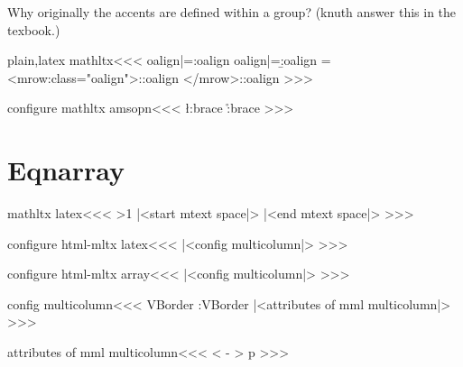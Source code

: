 {{Why originally the accents are defined within a group? (knuth answer
this in the texbook.)

\<plain,latex mathltx\><<<
\let\A:oalign|=\a:oalign
\let\B:oalign|=\b:oalign
   {\ifmmode {}%
             \let\halign|=\TeXhalign
             \Tg<mrow\Hnewline \mml:class="oalign">\else\A:oalign
    \fi}
   {\ifmmode \Tg</mrow>\else\B:oalign\fi}
>>>


\<configure mathltx amsopn\><<<
   {
      {\string\mathop\l:brace}
      {\r:brace}
      {}}
>>>



\section{Eqnarray}

\<mathltx latex\><<<
   {\HCode{\string\begin{eqnarray\ifx 
       \@seqncr\@eqncr\else *\fi}}}
   {\HCode{\string\end{eqnarray\ifx
       \@seqncr\@eqncr\else *\fi}}}
   {}
   {\HCode{\string\\\Hnewline}}
   {\ifnum \HCol>1 
      \ifnum {}       
        \HCode{\%}%
        |<start mtext space|>\PauseMathClass 
        \mtexttrue
      \fi {}%
    \fi}
   {\ifnum {} \mtextfalse 
      \EndPauseMathClass |<end mtext space|>\fi }
>>>




\<configure html-mltx latex\><<<
|<config multicolumn|>
>>>


\<configure html-mltx array\><<<
|<config multicolumn|>
>>>


\<config multicolumn\><<<
   {\let\sv:VBorder\VBorder
    \let\VBorder\empty
   }
   {\let\VBorder\sv:VBorder}
   {\ifmmode {}%
       {|<attributes of mml multicolumn|>\HColAlign}%
       \else
       \ifvmode\IgnorePar\fi
       \HColAlign\HCode{>}\fi }
   {\ifmmode  {}\else
    \ifvmode\IgnorePar\fi \EndP{}\fi }
\def\gob:sp#1{#1}
>>>


\<attributes of mml multicolumn\><<<
 {}{}
   {<}{}
   {-}{}
   {>}{}
   {p}{}
   {}%
>>>


}}
